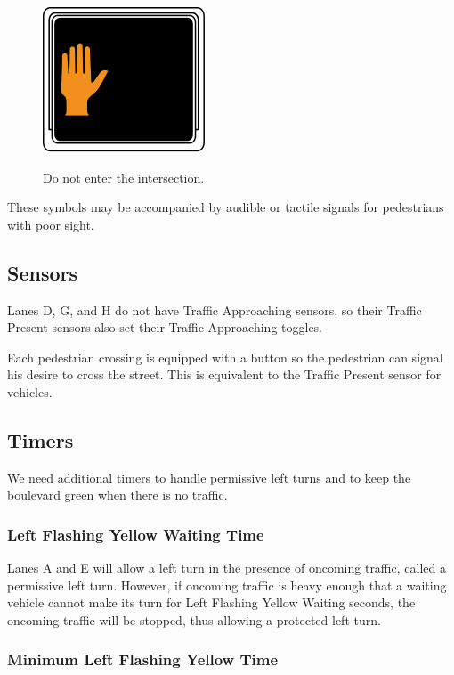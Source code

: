 \documentclass[letterpaper,twoside]{article}
\begin{document}
\begin{figure}[H]
  \fcapside
           {\includegraphics{MUTCD_Ped_Signal_-_Steady_hand}}
           {\caption{Do not enter the intersection.}}
\end{figure}

These symbols may be accompanied by audible or tactile signals for
pedestrians with poor sight.

\subsection{Sensors}

Lanes D, G, and H do not have Traffic Approaching sensors, so their
Traffic Present sensors also set their Traffic Approaching toggles.

Each pedestrian crossing is equipped with a button so the pedestrian can
signal his desire to cross the street.  This is equivalent to the
Traffic Present sensor for vehicles.

\subsection{Timers}

We need additional timers to handle permissive left turns and to
keep the boulevard green when there is no traffic.

\subsubsection{Left Flashing Yellow Waiting Time}

Lanes A and E will allow a left turn in the presence of oncoming traffic,
called a permissive left turn. However, if oncoming traffic is heavy enough
that a waiting vehicle cannot make its turn for Left Flashing Yellow Waiting
seconds, the oncoming traffic will be stopped, thus allowing a protected left
turn.

\subsubsection{Minimum Left Flashing Yellow Time}
\end{document}
